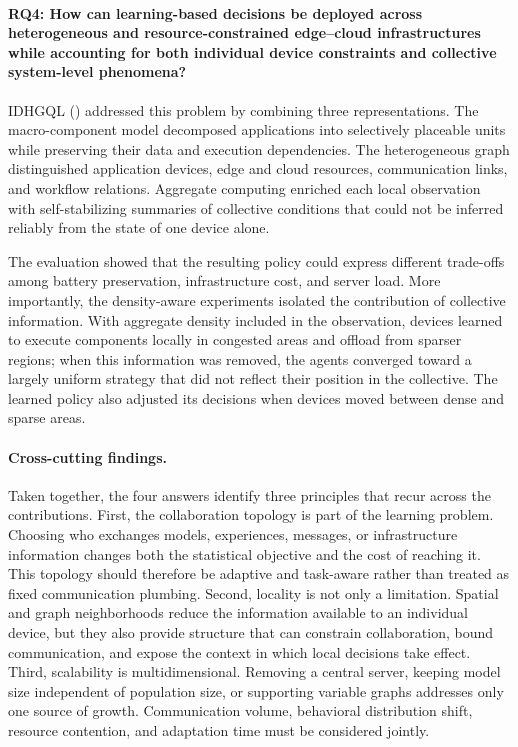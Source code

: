 \paragraph{RQ4: How can learning-based decisions be deployed across heterogeneous
and resource-constrained edge--cloud infrastructures while accounting for both
individual device constraints and collective system-level phenomena?}
IDHGQL () addressed this problem by combining three representations.
%
The macro-component model decomposed applications into selectively placeable
 units while preserving their data and execution dependencies.
%
The heterogeneous graph distinguished application devices,
 edge and cloud resources, communication links, and workflow relations.
%
Aggregate computing enriched each local observation with self-stabilizing
 summaries of collective conditions that could not be inferred reliably from the
 state of one device alone.

The evaluation showed that the resulting policy could express different
 trade-offs among battery preservation, infrastructure cost, and server load.
%
More importantly, the density-aware experiments isolated the contribution of
 collective information. 
% 
With aggregate density included in the observation,
 devices learned to execute components locally in congested areas and offload from
 sparser regions; when this information was removed, the agents converged toward a
 largely uniform strategy that did not reflect their position in the collective.
%
The learned policy also adjusted its decisions when devices moved between dense
 and sparse areas.

\paragraph{Cross-cutting findings.}
Taken together, the four answers identify three principles that recur across the
contributions.
%
First, the collaboration topology is part of the learning problem. Choosing who
exchanges models, experiences, messages, or infrastructure information changes
both the statistical objective and the cost of reaching it. This topology should
therefore be adaptive and task-aware rather than treated as fixed communication
plumbing.
%
Second, locality is not only a limitation. Spatial and graph neighborhoods reduce
the information available to an individual device, but they also provide structure
that can constrain collaboration, bound communication, and expose the context in
which local decisions take effect.
%
Third, scalability is multidimensional. Removing a central server, keeping model
size independent of population size, or supporting variable graphs addresses only
one source of growth. Communication volume, behavioral distribution shift,
resource contention, and adaptation time must be considered jointly.

